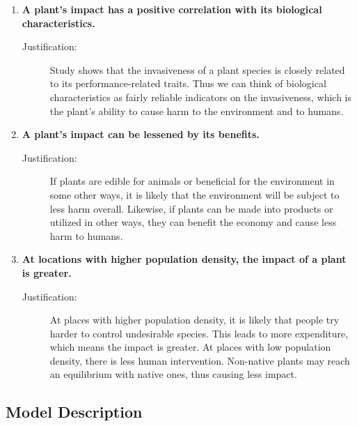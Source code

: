 \documentclass[12pt]{article}
\begin{document}
		\begin{enumerate}
			
			\item \textbf{A plant's impact has a positive correlation with its biological characteristics.}
			\vspace{-0.125in}
			\begin{description}
				\item[Justification:] Study shows that the invasiveness of a plant species is closely related to its performance-related traits\autocite{van2010meta}.  Thus we can think of biological characteristics as fairly reliable indicators on the invasiveness, which is the plant's ability to cause harm to the environment and to humans.  
			\end{description}
			
			\item \label{assumption:offset} \textbf{A plant's impact can be lessened by its benefits.}
			\vspace{-0.125in}
			\begin{description}
				\item[Justification:] If plants are edible for animals or beneficial for the environment in some other ways, it is likely that the environment will be subject to less harm overall.  Likewise, if plants can be made into products or utilized in other ways, they can benefit the economy and cause less harm to humans.  
			\end{description}
			
			\item \textbf{At locations with higher population density, the impact of a plant is greater.}
			\vspace{-0.125in}
			\begin{description}
				\item[Justification:] At places with higher population density, it is likely that people try harder to control undesirable species.  This leads to more expenditure, which means the impact is greater.  At places with low population density, there is less human intervention. Non-native plants may reach an equilibrium with native ones, thus causing less impact.  
			\end{description}
			
		\end{enumerate}
	
	\subsection{Model Description}
	
\end{document}
